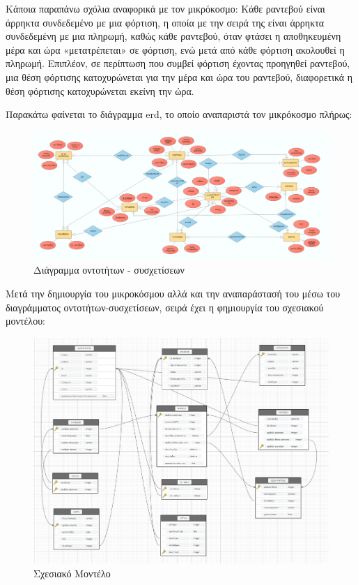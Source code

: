 \documentclass[manuscript,screen,review]{acmart}
\newcommand{\en}[1]{\foreignlanguage{english}{#1}}
\begin{document}
Κάποια παραπάνω σχόλια αναφορικά με τον μικρόκοσμο:
Κάθε ραντεβού είναι άρρηκτα συνδεδεμένο με μια φόρτιση, η οποία με την σειρά της είναι άρρηκτα
συνδεδεμένη με μια πληρωμή, καθώς κάθε ραντεβού, όταν φτάσει η αποθηκευμένη μέρα και ώρα 
«μετατρέπεται» σε φόρτιση, ενώ μετά από κάθε φόρτιση ακολουθεί η πληρωμή. Επιπλέον, σε περίπτωση 
που συμβεί φόρτιση έχοντας προηγηθεί ραντεβού, μια θέση φόρτισης κατοχυρώνεται για την μέρα και
ώρα του ραντεβού, διαφορετικά η θέση φόρτισης κατοχυρώνεται εκείνη την ώρα.

Παρακάτω φαίνεται το διάγραμμα \en{erd}, το οποίο αναπαριστά τον μικρόκοσμο πλήρως:

\begin{figure}[H]
    \centering
    \includegraphics[width=1.1\textwidth]{./Διάγραμμα οντοτήτων συσχετίσεων (τελικό)_3.png}
    \caption{Διάγραμμα οντοτήτων - συσχετίσεων}
\end{figure}
\newpage
Μετά την δημιουργία του μικροκόσμου αλλά και την αναπαράστασή του μέσω του διαγράμματος
οντοτήτων-συσχετίσεων, σειρά έχει η φημιουργία του σχεσιακού μοντέλου:

\begin{figure}[H]
    \centering
    \includegraphics[width=1.1\textwidth]{./schema_final.png}
    \caption{Σχεσιακό Μοντέλο}
\end{figure}
\end{document}

